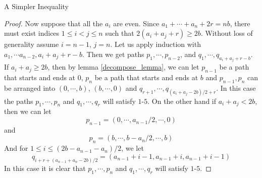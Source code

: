 \documentclass[11pt,a4paper]{article}
\begin{document}
\begin{section}{A Simpler Inequality}
\begin{proof}
\medskip

Now suppose that all the $a_i$ are even. Since $a_1 + \cdots + a_n + 2r = n b$, there must exist indices $1 \leq i < j \leq n$ such that $2 (a_i + a_j + r) \geq 2b$. Without loss of generality assume $i = n - 1$, $j = n$. Let us apply induction with $a_1, \cdots a_{n - 2}, a_i + a_j + r - b$. Then we get paths $p_1, \cdots, p_{n - 2}$, and $q_1, \cdots, q_{a_i + a_j + r - b}$. If $a_i + a_j \geq 2b$, then by lemma \ref{decompose_lemma}, we can let $p_{n- 1}$ be a path that starts and ends at $0$, $p_{n}$ be a path that starts and ends at $b$ and $p_{n - 1}, p_n$ can be arranged into $(0, \cdots, b)$, $(b, \cdots, 0)$ and $q_{r + 1}, \cdots, q_{ (a_i + a_j - 2b)/2 + r }$. In this case the paths $p_1, \cdots, p_n$ and $q_1, \cdots, q_r$ will satisfy $1$-$5$. On the other hand if $a_i + a_j < 2b$, then we can let
\[
p_{n - 1} = (0, \cdots, a_{n - 1}/2, \cdots, 0)
\]
and
\[
p_n = (b, \cdots, b - a_n/2, \cdots, b )
\]
And for $1 \leq i \leq (2b - a_{n - 1} - a_n)/2$, we let
\[
q_{i + r + (a_{n - 1} + a_n - 2b)/2 } = ( a_{n - 1} + i - 1, a_{n - 1} + i, a_{n - 1} + i - 1)
\]
In this case it is clear that $p_1, \cdots, p_n$ and $q_1, \cdots, q_{ r}$ will satisfy $1$-$5$.
\end{proof}


\end{section}
\end{document}
